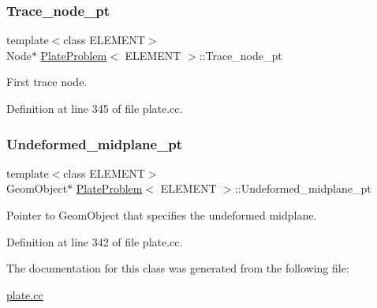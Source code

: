 \mbox{\label{classPlateProblem_a376d88f920e7bd37f22c7835bae5d837}} 
\subsubsection{\texorpdfstring{Trace\+\_\+node\+\_\+pt}{Trace\_node\_pt}}
{\footnotesize\ttfamily template$<$class E\+L\+E\+M\+E\+NT$>$ \\
Node$\ast$ \hyperlink{classPlateProblem}{Plate\+Problem}$<$ E\+L\+E\+M\+E\+NT $>$\+::Trace\+\_\+node\+\_\+pt\hspace{0.3cm}{\ttfamily [private]}}



First trace node. 



Definition at line 345 of file plate.\+cc.

\mbox{\label{classPlateProblem_aca229d8f14f7cf1fe21fe936db72dbc2}} 
\subsubsection{\texorpdfstring{Undeformed\+\_\+midplane\+\_\+pt}{Undeformed\_midplane\_pt}}
{\footnotesize\ttfamily template$<$class E\+L\+E\+M\+E\+NT$>$ \\
Geom\+Object$\ast$ \hyperlink{classPlateProblem}{Plate\+Problem}$<$ E\+L\+E\+M\+E\+NT $>$\+::Undeformed\+\_\+midplane\+\_\+pt\hspace{0.3cm}{\ttfamily [private]}}



Pointer to Geom\+Object that specifies the undeformed midplane. 



Definition at line 342 of file plate.\+cc.



The documentation for this class was generated from the following file\+:\begin{DoxyCompactItemize}
\item 
\hyperlink{plate_8cc}{plate.\+cc}\end{DoxyCompactItemize}
